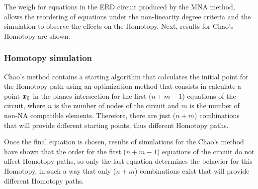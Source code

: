 \documentclass[conference,letterpaper,onecolumn,11pt]{IEEEtran}
\newcommand{\pig}[1]{\mbox{\boldmath ${#1}$}	}
\begin{document}
\begin{table}[!h]
\caption{Weights for branch functions in the ERD circuit.}
\label{ERDpesosRamas}
\end{table}

\begin{table}[!h]
\caption{Weights for nodes in the ERD circuit.}
\label{ERDpesosNodos}
\end{table}

The weigh for equations in the ERD circuit produced by the MNA method, allows the reordering of equations under the non-linearity degree criteria and the simulation to observe the effects on the Homotopy. Next, results for Chao's Homotopy are shown.

\subsubsection{Homotopy simulation}

Chao's method contains a starting algorithm that calculates the initial point for the Homotopy path using an optimization method that consists in calculate a point $\pig{x}_0$ in the planes intersection for the first ($n+m-1$) equations of the circuit, where $n$ is the number of nodes of the circuit and $m$ is the number of non-NA compatible elements. Therefore, there are just ($n+m$) combinations that will provide different starting points, thus different Homotopy paths.

Once the final equation is chosen, results of simulations for the Chao's method have shown that the order for the first ($n+m-1$) equations of the circuit do not affect Homotopy paths, so only the last equation determines the behavior for this Homotopy, in such a way that only ($n+m$) combinations exist that will provide different Homotopy paths.
\end{document}
